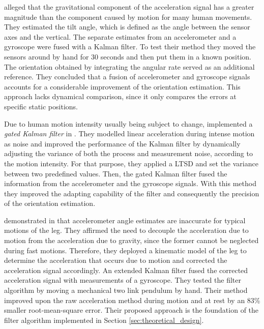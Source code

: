 \citeauthor{Luinge_orientation_acc_gyro_99} \cite{Luinge_orientation_acc_gyro_99} alleged that the gravitational component of the acceleration signal has a greater magnitude than the component caused by motion for many human movements. They estimated the tilt angle, which is defined as the angle between the sensor axes and the vertical. The separate estimates from an accelerometer and a gyroscope were fused with a Kalman filter. To test their method they moved the sensors around by hand for 30 seconds and then put them in a known position. The orientation obtained by integrating the angular rate served as an additional reference. They concluded that a fusion of accelerometer and gyroscope signals accounts for a considerable improvement of the orientation estimation. This approach lacks dynamical comparison, since it only compares the errors at specific static positions.

Due to human motion intensity usually being subject to change, \citeauthor{olivares_vicente_signal_2013} implemented a \emph{gated Kalman filter} in \cite{olivares_vicente_signal_2013}. They modelled linear acceleration during intense motion as noise and improved the performance of the Kalman filter by dynamically adjusting the variance of both the process and measurement noise, according to the motion intensity. For that purpose, they applied a \gls{LTSD} and set the variance between two predefined values. Then, the gated Kalman filter fused the information from the accelerometer and the gyroscope signals. With this method they improved the adapting capability of the filter and consequently the precision of the orientation estimation.

\citeauthor{bennett_motion_2014} demonstrated in \cite{bennett_motion_2014} that accelerometer angle estimates are inaccurate for typical motions of the leg. They affirmed the need to decouple the acceleration due to motion from the acceleration due to gravity, since the former cannot be neglected during fast motions. Therefore, they deployed a kinematic model of the leg to determine the acceleration that occurs due to motion and corrected the acceleration signal accordingly. An extended Kalman filter fused the corrected acceleration signal with measurements of a gyroscope. They tested the filter algorithm by moving a mechanical two link pendulum by hand. Their method improved upon the raw acceleration method during motion and at rest by an 83\% smaller root-mean-square error. Their proposed approach is the foundation of the filter algorithm implemented in Section \ref{sec:theoretical_design}.

